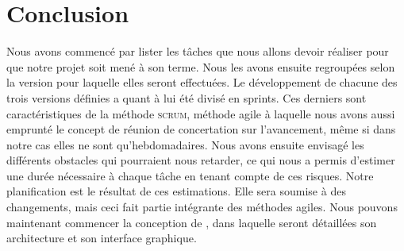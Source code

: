 \section{Conclusion}
    \label{sec:conclusion}

    Nous avons commencé par lister les tâches que nous allons devoir réaliser pour que notre projet soit mené à son terme. Nous les avons ensuite regroupées selon la version pour laquelle elles seront effectuées. Le développement de chacune des trois versions définies a quant à lui été divisé en sprints. Ces derniers sont caractéristiques de la méthode \textsc{scrum}, méthode agile à laquelle nous avons aussi emprunté le concept de réunion de concertation sur l'avancement, même si dans notre cas elles ne sont qu'hebdomadaires. Nous avons ensuite envisagé les différents obstacles qui pourraient nous retarder, ce qui nous a permis d'estimer une durée nécessaire à chaque tâche en tenant compte de ces risques. Notre planification est le résultat de ces estimations. Elle sera soumise à des changements, mais ceci fait partie intégrante des méthodes agiles. Nous pouvons maintenant commencer la conception de \glasir{}, dans laquelle seront détaillées son architecture et son interface graphique.